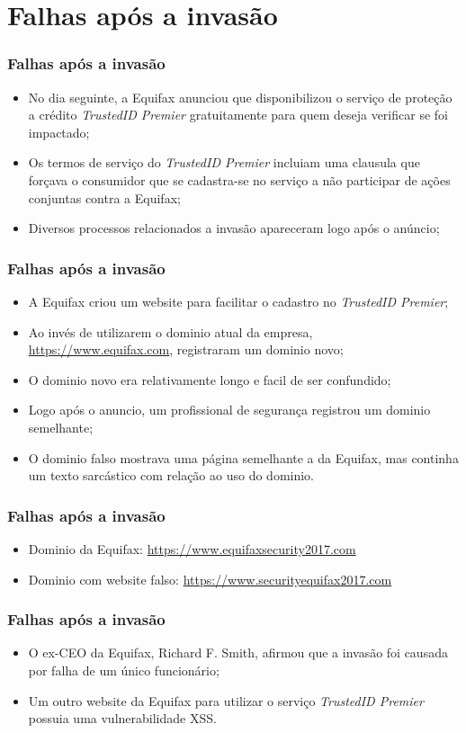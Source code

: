 \documentclass{beamer}
\begin{document}
	\section{Falhas após a invasão}
	\begin{frame}
		\frametitle{Falhas após a invasão}
		\begin{itemize}
			\item No dia seguinte, a Equifax anunciou que disponibilizou o serviço de proteção a crédito \textit{TrustedID Premier} gratuitamente para quem deseja verificar se foi impactado;
			\item Os termos de serviço do \textit{TrustedID Premier} incluiam uma clausula que forçava o consumidor que se cadastra-se no serviço a não participar de ações conjuntas contra a Equifax;
			\item Diversos processos relacionados a invasão apareceram logo após o anúncio;
		\end{itemize}
	\end{frame}
	\begin{frame}
		\frametitle{Falhas após a invasão}
		\begin{itemize}
			\item A Equifax criou um website para facilitar o cadastro no \textit{TrustedID Premier};
			\item Ao invés de utilizarem o dominio atual da empresa, \url{https://www.equifax.com}, registraram um dominio novo;
			\item O dominio novo era relativamente longo e facil de ser confundido;
			\item Logo após o anuncio, um profissional de segurança registrou um dominio semelhante;
			\item O dominio falso mostrava uma página semelhante a da Equifax, mas continha um texto sarcástico com relação ao uso do dominio. 
		\end{itemize}
	\end{frame}
	\begin{frame}
		\frametitle{Falhas após a invasão}
			\begin{itemize}
				\item Dominio da Equifax: \url{https://www.equifaxsecurity2017.com}
				\item Dominio com website falso: \url{https://www.securityequifax2017.com}
			\end{itemize}
	\end{frame}
	\begin{frame}
		\frametitle{Falhas após a invasão}
		\begin{itemize}
			\item O ex-CEO da Equifax, Richard F. Smith, afirmou que a invasão foi causada por falha de um único funcionário;
			\item Um outro website da Equifax para utilizar o serviço \textit{TrustedID Premier} possuia uma vulnerabilidade XSS.
		\end{itemize}
	\end{frame}
\end{document}
